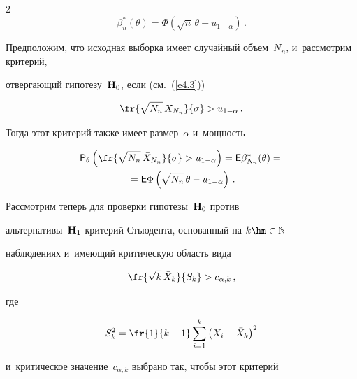 \begin{multicols}{2}
\begin{equation*}


\beta^*_n(\theta) = \Phi\left(\sqrt {n}\,  \theta - u_{1-\alpha}\right)\,.




\end{equation*}


Предположим, что исходная выборка имеет случайный объем~$N_n$, и~рассмотрим критерий, 


отвергающий гипотезу~${\bf H}_0$, если (см.~(\ref{e4.3}))


\begin{equation}


\fr{\sqrt {N_n}\, \bar X_{N_n}}{\sigma} > u_{1-\alpha}\,.\label{e4.5}


\end{equation}


Тогда этот критерий также имеет размер~$\alpha$ и~мощность


\begin{multline*}


{\sf P}_\theta \left(\fr{\sqrt {N_n}\, \bar X_{N_n}}{\sigma} > 


u_{1-\alpha}\right) = {\sf E} \beta^*_{N_n}(\theta) ={}


\\


{}= {\sf E} \Phi\left(\sqrt {N_n}\, \theta - u_{1-\alpha}\right)\,.




\end{multline*}


Рассмотрим теперь для проверки гипотезы~${\bf H}_0$ против 


альтернативы~${\bf H}_1$ критерий Стьюдента, основанный на $k\hm \in \mathbb{N}$ 


наблюдениях и~имеющий критическую область вида


\begin{equation}


\fr{\sqrt {k}\,\bar X_k}{S_k} > c_{\alpha,k}\,,


\label{e4.7}


\end{equation}


где


$$


S_k^2 = \fr{1}{k-1} \sum\limits_{i=1}^k \left(X_i - \bar X_k\right)^2


$$


и~критическое значение~$c_{\alpha,k}$ выбрано так, чтобы этот критерий 



\end{multicols}
